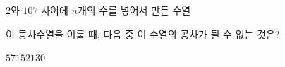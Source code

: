 $2$와 $107$ 사이에 $n$개의 수를 넣어서 만든 수열 \par\smallskip{}\par\smallskip\noindent 이 등차수열을 이룰 때, 다음 중 이 수열의 공차가 될 수 \underline{없는} 것은?
\begin{choices32}{$5$}{$7$}{$15$}{$21$}{$30$}\end{choices32}
